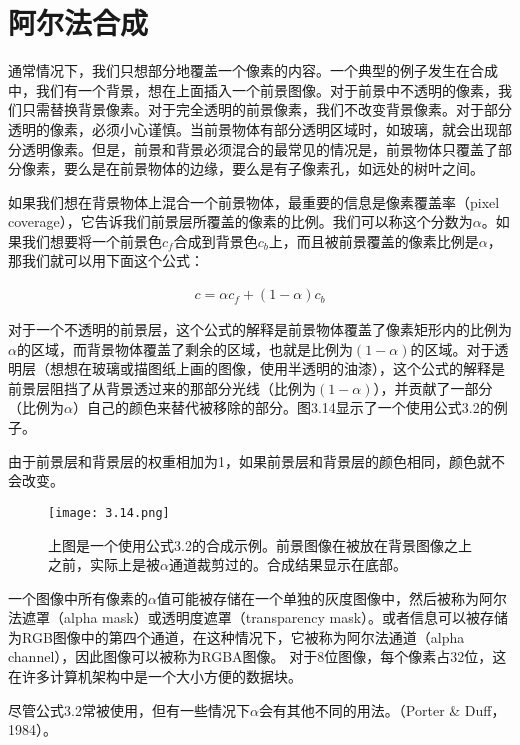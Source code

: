 \documentclass[lang=cn,12pt]{elegantbook}
\begin{document}
\section{阿尔法合成}

通常情况下，我们只想部分地覆盖一个像素的内容。一个典型的例子发生在合成中，我们有一个背景，想在上面插入一个前景图像。对于前景中不透明的像素，我们只需替换背景像素。对于完全透明的前景像素，我们不改变背景像素。对于部分透明的像素，必须小心谨慎。当前景物体有部分透明区域时，如玻璃，就会出现部分透明像素。但是，前景和背景必须混合的最常见的情况是，前景物体只覆盖了部分像素，要么是在前景物体的边缘，要么是有子像素孔，如远处的树叶之间。

如果我们想在背景物体上混合一个前景物体，最重要的信息是像素覆盖率（pixel coverage），它告诉我们前景层所覆盖的像素的比例。我们可以称这个分数为$\alpha $。如果我们想要将一个前景色$c_f$合成到背景色$c_b$上，而且被前景覆盖的像素比例是$\alpha $，那我们就可以用下面这个公式：

\begin{align}
  c = \alpha c_f + (1 - \alpha )c_b
\end{align}

对于一个不透明的前景层，这个公式的解释是前景物体覆盖了像素矩形内的比例为$\alpha $的区域，而背景物体覆盖了剩余的区域，也就是比例为$(1-\alpha )$的区域。对于透明层（想想在玻璃或描图纸上画的图像，使用半透明的油漆），这个公式的解释是前景层阻挡了从背景透过来的那部分光线（比例为$(1-\alpha )$），并贡献了一部分（比例为$\alpha $）自己的颜色来替代被移除的部分。图3.14显示了一个使用公式3.2的例子。

\begin{note}
  由于前景层和背景层的权重相加为1，如果前景层和背景层的颜色相同，颜色就不会改变。
\end{note}

\begin{figure}[htb]
  \centering
  \texttt{[image: 3.14.png]}
  \caption{上图是一个使用公式3.2的合成示例。前景图像在被放在背景图像之上之前，实际上是被$\alpha $通道裁剪过的。合成结果显示在底部。}
\end{figure}

一个图像中所有像素的$\alpha $值可能被存储在一个单独的灰度图像中，然后被称为阿尔法遮罩（alpha mask）或透明度遮罩（transparency mask）。或者信息可以被存储为RGB图像中的第四个通道，在这种情况下，它被称为阿尔法通道（alpha channel），因此图像可以被称为RGBA图像。
对于8位图像，每个像素占32位，这在许多计算机架构中是一个大小方便的数据块。

尽管公式3.2常被使用，但有一些情况下$\alpha $会有其他不同的用法。（Porter \& Duff，1984）。
\end{document}
